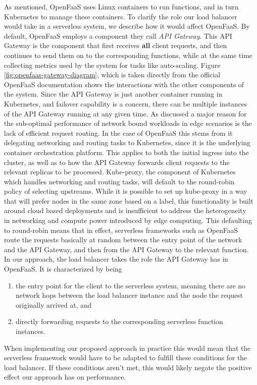 As mentioned, OpenFaaS uses Linux containers to run functions, and in turn Kubernetes to manage these containers. To clarify the role our load balancer would take in a serverless system, we describe how it would affect OpenFaaS. By default, OpenFaaS employs a component they call \textit{API Gateway}. This API Gateway is the component that first receives \textbf{all} client requests, and then continues to send them on to the corresponding functions, while at the same time collecting metrics used by the system for tasks like auto-scaling. Figure \ref{fig:openfaas-gateway-diagram}, which is taken directly from the official OpenFaaS documentation shows the interactions with the other components of the system. Since the API Gateway is just another container running in Kubernetes\cite{kubernetes}, and failover capability is a concern, there can be multiple instances of the API Gateway running at any given time.
As discussed a major reason for the sub-optimal performance of network bound workloads in edge scenarios is the lack of efficient request routing.
In the case of OpenFaaS this stems from it delegating networking and routing tasks to Kubernetes, since it is the underlying container orchestration platform. This applies to both the initial ingress into the cluster, as well as to how the API Gateway forwards client requests to the relevant replicas to be processed. Kube-proxy, the component of Kubernetes which handles networking and routing tasks, will default to the round-robin policy of selecting upstreams. While it is possible to set up kube-proxy in a way that will prefer nodes in the same zone based on a label, this functionality is built around cloud based deployments and is insufficient to address the heterogeneity in networking and compute power introduced by edge computing. This defaulting to round-robin means that in effect, serverless frameworks such as OpenFaaS route the requests basically at random between the entry point of the network and the API Gateway, and then from the API Gateway to the relevant function.\\
In our approach, the load balancer takes the role the API Gateway has in OpenFaaS. It is characterized by being
\begin{enumerate}
    \item the entry point for the client to the serverless system, meaning there are no network hops between the load balancer instance and the node the request originally arrived at, and
    \item directly forwarding requests to the corresponding serverless function instances.
\end{enumerate}
When implementing our proposed approach in practice this would mean that the serverless framework would have to be adapted to fulfill these conditions for the load balancer. If these conditions aren't met, this would likely negate the positive effect our approach has on performance.

